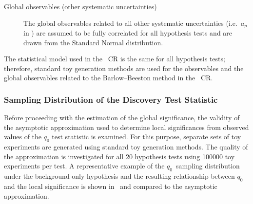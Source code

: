 \begin{description}
\item[Global observables (other systematic uncertainties)] The global
  observables related to all other systematic uncertainties (i.e.~$a_p$ in
  ) are assumed to be fully
  correlated for all hypothesis tests and are drawn from the Standard Normal
  distribution.

\end{description}
The statistical model used in the \ZHF~CR is the same for all hypothesis tests;
therefore, standard toy generation methods are used for the observables and the
global observables related to the Barlow--Beeston method in the \ZHF~CR.

%
%
%


\subsubsection{Sampling Distribution of the Discovery Test Statistic}

Before proceeding with the estimation of the global significance, the validity
of the asymptotic approximation used to determine local significances from
observed values of the $q_0$ test statistic
is examined. For this purpose, separate sets of toy experiments are generated
using standard toy generation methods.
The quality of the approximation is investigated for all 20 hypothesis tests
using \num{100000} toy experiments per test.
A representative example of the $q_0$~sampling distribution under the
background-only hypothesis and the resulting relationship between $q_0$ and the
local significance is shown in~ and compared to the
asymptotic approximation.

